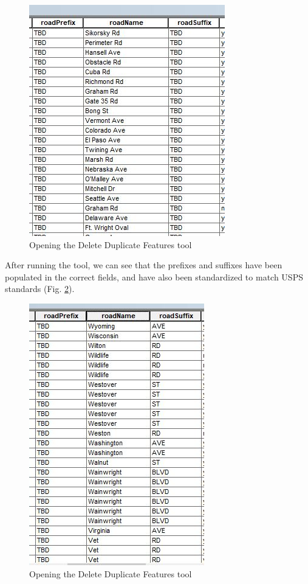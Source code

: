 \documentclass[openany]{book}
\theoremstyle{definition}
\theoremstyle{definition}
\theoremstyle{definition}
\theoremstyle{remark}
\begin{document}
\begin{figure}[H]

{\centering \includegraphics{figures/std3-before} 

}

\caption{Opening the Delete Duplicate Features tool}\label{fig:std3before}
\end{figure}

After running the tool, we can see that the prefixes and suffixes have
been populated in the correct fields, and have also been standardized to
match USPS standards (Fig. \ref{fig:std3after}).

\begin{figure}[H]

{\centering \includegraphics{figures/std3-after} 

}

\caption{Opening the Delete Duplicate Features tool}\label{fig:std3after}
\end{figure}
\end{document}
